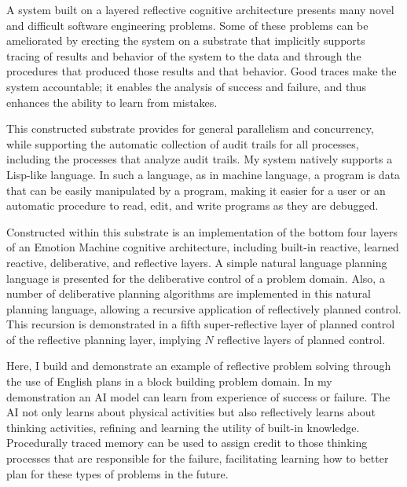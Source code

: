 A system built on a layered reflective cognitive architecture presents
many novel and difficult software engineering problems.  Some of these
problems can be ameliorated by erecting the system on a substrate that
implicitly supports tracing of results and behavior of the system to
the data and through the procedures that produced those results and
that behavior.  Good traces make the system accountable; it enables
the analysis of success and failure, and thus enhances the ability to
learn from mistakes.

This constructed substrate provides for general parallelism and
concurrency, while supporting the automatic collection of audit trails
for all processes, including the processes that analyze audit trails.
My system natively supports a Lisp-like language.  In such a language,
as in machine language, a program is data that can be easily
manipulated by a program, making it easier for a user or an automatic
procedure to read, edit, and write programs as they are debugged.

Constructed within this substrate is an implementation of the bottom
four layers of an Emotion Machine cognitive architecture, including
built-in reactive, learned reactive, deliberative, and reflective
layers.  A simple natural language planning language is presented for
the deliberative control of a problem domain.  Also, a number of
deliberative planning algorithms are implemented in this natural
planning language, allowing a recursive application of reflectively
planned control.  This recursion is demonstrated in a fifth
super-reflective layer of planned control of the reflective planning
layer, implying $N$ reflective layers of planned control.

Here, I build and demonstrate an example of reflective problem solving
through the use of English plans in a block building problem domain.
In my demonstration an AI model can learn from experience of success
or failure.  The AI not only learns about physical activities but also
reflectively learns about thinking activities, refining and learning
the utility of built-in knowledge.  Procedurally traced memory can be
used to assign credit to those thinking processes that are responsible
for the failure, facilitating learning how to better plan for these
types of problems in the future.
